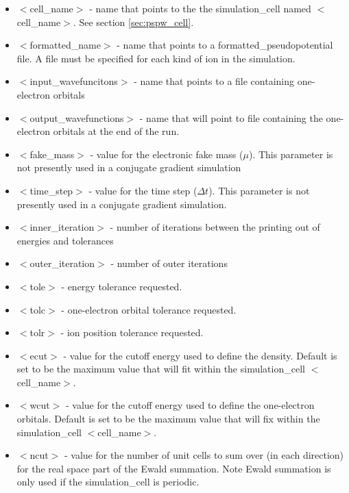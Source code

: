 \begin{itemize}
	\item $<$cell\_name$>$ - name that points to the
              the simulation\_cell named $<$cell\_name$>$.  See section \ref{sec:pspw_cell}.
	\item $<$formatted\_name$>$ - name that points
              to a formatted\_pseudopotential file.  A file must
              be specified for each kind of ion in the simulation.
	\item $<$input\_wavefuncitons$>$ - name that points
              to a file containing one-electron orbitals
	\item $<$output\_wavefunctions$>$ - name that will
              point to file containing the one-electron orbitals at the
              end of the run. 
	\item $<$fake\_mass$>$ - value for the electronic
              fake mass ($\mu$). This parameter is not presently used in a 
              conjugate gradient simulation
	\item $<$time\_step$>$ - value for the time step ($\Delta t$).  This
              parameter is not presently used in a conjugate gradient simulation.
	\item $<$inner\_iteration$>$ - number of iterations between the 
              printing out of energies and tolerances
	\item $<$outer\_iteration$>$ - number of outer iterations
 	\item $<$tole$>$ - energy tolerance requested.
	\item $<$tolc$>$ - one-electron orbital tolerance requested.
	\item $<$tolr$>$ - ion position tolerance requested.
	\item $<$ecut$>$ - value for the cutoff energy used
                           to define the density. Default is set
                           to be the maximum value that will fit
                           within the simulation\_cell $<$cell\_name$>$.
	\item $<$wcut$>$ - value for the cutoff energy used
 			   to define the one-electron orbitals.
                           Default is set to be the maximum value that 
                           will fix within the simulation\_cell $<$cell\_name$>$.
	\item $<$ncut$>$ - value for the number of unit cells
 			  to sum over (in each direction) for the real space
			  part of the Ewald summation. Note Ewald summation
                          is only used if the simulation\_cell is periodic.

\end{itemize}
